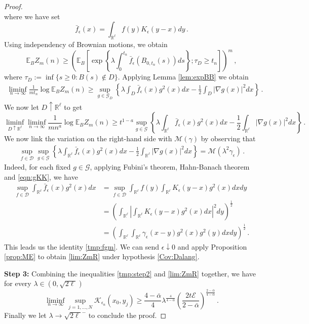 \documentclass[12pt,reqno]{amsart}
\theoremstyle{remark}
\newcommand{\1}{\mathbf{1}}
\def\RR{\mathbb{R}}
\def\EE{\mathbb{E}}
\def\K{\mathcal{K}}
\def\cee{{\mathcal E}}
\def\cmm{{\mathcal M}}
\def\cgg{{\mathcal G}}
\def\lt{\left}
\def\rt{\right}
\begin{document}
\begin{proof}
\begin{equation*}
		\end{equation*}
		where we have set
		\begin{equation*}
			\bar f_ \epsilon(x)=\int_{\RR^\ell}f(y)K_ \epsilon(y-x)dy\,.
		\end{equation*}
		Using independency of Brownian motions, we obtain
		\begin{equation*}
			\EE_B Z_m(n)\ge \lt(\EE_B\lt[\exp\lt\{\lambda\int_0^{t_n}\bar f_ \epsilon\lt(B_{0,t_n}(s)\rt)ds \rt\};\tau_D\ge t_n \rt] \rt)^m\,,
		\end{equation*}
		where $\tau_D := \inf\{s \geq 0: B(s) \notin D\}$. 
		Applying Lemma \ref{lem:expBB} we obtain
		\begin{align*}
			\liminf_{n\to\infty}\frac1{mt_n}\log\EE_B Z_m(n)\ge \sup_{g\in\cgg_D}\lt\{\lambda\int_D \bar f_ \epsilon(x)g^2(x)dx-\frac12\int_D|\nabla g(x)|^2dx \rt\}\,.
		\end{align*}
		We now let $D\uparrow\RR^\ell$ to get
		\begin{equation*}
			\liminf_{D\uparrow\RR^\ell}\liminf_{n\to\infty}\frac1{mn^a }\log\EE_B Z_m(n)\ge t^{1-a} \sup_{g\in\cgg}\lt\{\lambda\int_{\RR^\ell} \bar f_ \epsilon(x)g^2(x)dx-\frac12\int_{\RR^\ell}|\nabla g(x)|^2dx \rt\}\,.
		\end{equation*} 
		We now link the variation on the right-hand side with $\cmm(\gamma)$ by observing that
		\begin{align}\label{tmp:fgm}
			\sup_{f \in \mathcal{D}}\sup_{g\in\cgg}\lt\{\lambda\int_{\RR^\ell} \bar f_ \epsilon(x)g^2(x)dx-\frac12\int_{\RR^\ell}|\nabla g(x)|^2dx \rt\}=\cmm(\lambda^2\gamma_ \epsilon)\,.
		\end{align} 
		Indeed, for each fixed $g\in\cgg$, applying Fubini's theorem, Hahn-Banach theorem and \eqref{eqn:gKK}, we have
		\begin{align*}
			\sup_{f\in \mathcal D} \int_{\RR^\ell}\bar f_ \epsilon(x)g^2(x)dx
			&=\sup_{f\in \mathcal D}\int_{\RR^\ell}f(y)\int_{\RR^\ell}K_ \epsilon(y-x)g^2(x)dxdy
			\\&=\lt(\int_{\RR^\ell}\lt|\int_{\RR^\ell}K_ \epsilon(y-x)g^2(x)dx \rt|^2dy \rt)^{\frac12}
			\\&=\lt(\int_{\RR^\ell}\int_{\RR^\ell}\gamma_ \epsilon(x-y)g^2(x)g^2(y)dxdy \rt)^{\frac12}\,.
		\end{align*}
		This leads us the identity \eqref{tmp:fgm}.
		We can send $\epsilon\downarrow0$ and apply Proposition \ref{prop:ME} to obtain \eqref{lim:ZmR} under hypothesis \ref{Cov:Dalang}.
		
		\textbf{Step 3:} Combining the inequalities \eqref{tmp:step2} and \eqref{lim:ZmR}  together, we have for every $\lambda\in(0,\sqrt{2\ell})$
		\begin{equation*}
			\liminf_{n\to\infty}\sup_{j =1, \dots, N}\K_ {\epsilon_n}(x_0,y_j)\ge \frac{4- \bar\alpha}4 \lambda^{\frac4{4- \bar\alpha}} \lt(\frac{2t\cee}{2- \bar\alpha} \rt)^{\frac{2- \bar\alpha}{4- \bar\alpha}}\,.
		\end{equation*}
		Finally we let $\lambda \to \sqrt{2\ell}^-$ to conclude the proof.
	\end{proof}
\end{document}
